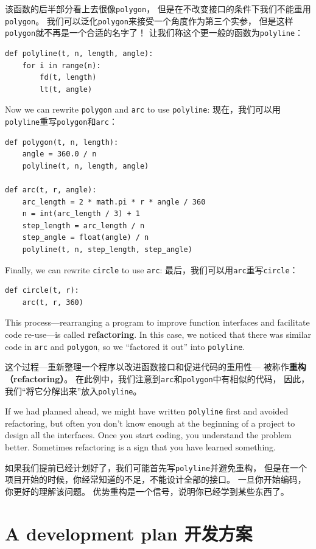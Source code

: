 \documentclass[10pt]{book}
\begin{document}
\begin{CJK}{UTF8}{gbsn}
该函数的后半部分看上去很像{\tt polygon}，
但是在不改变接口的条件下我们不能重用{\tt polygon}。
我们可以泛化{\tt polygon}来接受一个角度作为第三个实参，
但是这样{\tt polygon}就不再是一个合适的名字了！
让我们称这个更一般的函数为{\tt polyline}：

\begin{verbatim}
def polyline(t, n, length, angle):
    for i in range(n):
        fd(t, length)
        lt(t, angle)
\end{verbatim}
%
Now we can rewrite {\tt polygon} and {\tt arc} to use {\tt polyline}:
现在，我们可以用{\tt polyline}重写{\tt polygon}和{\tt arc}：

\begin{verbatim}
def polygon(t, n, length):
    angle = 360.0 / n
    polyline(t, n, length, angle)

def arc(t, r, angle):
    arc_length = 2 * math.pi * r * angle / 360
    n = int(arc_length / 3) + 1
    step_length = arc_length / n
    step_angle = float(angle) / n
    polyline(t, n, step_length, step_angle)
\end{verbatim}
%
Finally, we can rewrite {\tt circle} to use {\tt arc}:
最后，我们可以用{\tt arc}重写{\tt circle}：

\begin{verbatim}
def circle(t, r):
    arc(t, r, 360)
\end{verbatim}
%
This process---rearranging a program to improve function
interfaces and facilitate code re-use---is called {\bf refactoring}.
In this case, we noticed that there was similar code in {\tt arc} and
{\tt polygon}, so we ``factored it out'' into {\tt polyline}.

这个过程---重新整理一个程序以改进函数接口和促进代码的重用性---
被称作{\bf 重构（refactoring）}。
在此例中，我们注意到{\tt arc}和{\tt polygon}中有相似的代码，
因此，我们``将它分解出来''放入{\tt polyline}。

If we had planned ahead, we might have written {\tt polyline} first
and avoided refactoring, but often you don't know enough at the
beginning of a project to design all the interfaces.  Once you start
coding, you understand the problem better.  Sometimes refactoring is a
sign that you have learned something.

如果我们提前已经计划好了，我们可能首先写{\tt polyline}并避免重构，
但是在一个项目开始的时候，你经常知道的不足，不能设计全部的接口。
一旦你开始编码，你更好的理解该问题。
优势重构是一个信号，说明你已经学到某些东西了。


\section{A development plan 开发方案}


\end{CJK}
\end{document}
